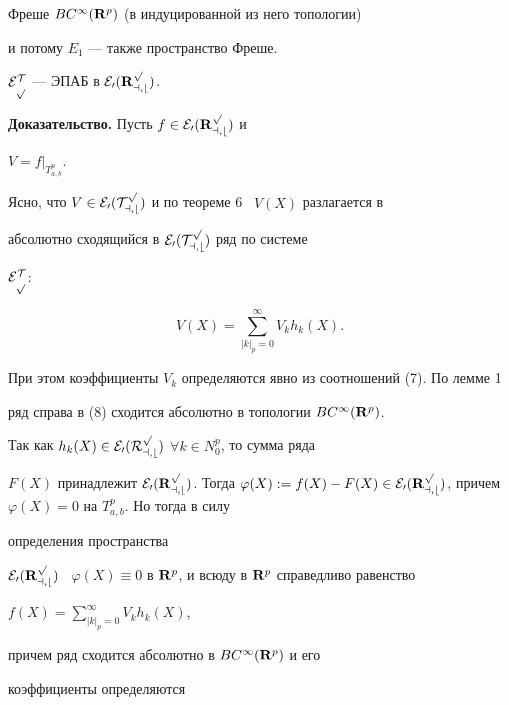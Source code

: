 Фреше $BC^{\infty}({\bold R}^p)$ (в индуцированной из него топологии) 


и потому $E_1$ --- также пространство Фреше.








\begin{thm}


$\cal{E} ^T_p$ --- ЭПАБ в $\cal{E} _0({\bold R}^p_{a,b})$.


\end{thm}








{\bf Доказательство.} Пусть $f\in \cal{E}_0({\bold R}^p_{a,b})$ и


$V=f|_{T^p_{a,b}}$.


Ясно, что $V\in\cal{E}_0(T^p_{a,b})$ и по теореме 6 \ $V(X)$ разлагается в


абсолютно сходящийся в $\cal{E}_0(T^p_{a,b})$ ряд по системе


$\cal{E}_p^T$:


\begin{equation}


V(X)=\sum^{\infty}_{|k|_p=0}V_kh_k(X).


\end{equation}


При этом коэффициенты $V_k$ определяются явно из соотношений (7). По лемме 1


ряд справа в (8) сходится абсолютно в топологии $BC^{\infty}({\bold R}^p)$.


Так как $h_k(X)\in\cal{E}_0(R_{a,b}^p)$ $\forall k\in N^p_0$, то сумма ряда


$F(X)$ принадлежит $\cal{E}_0({\bold R}^p_{a,b})$. Тогда $\varphi(X):=f(X)-


F(X)\in\cal{E}_0


({\bold R}^p_{a,b})$, причем $\varphi(X)=0$ на $T^p_{a,b}$. Но тогда в силу


определения пространства


$\cal{E}_0({\bold R}^p_{a,b})$ \ $\varphi(X)\equiv 0$ в ${\bold


R}^p$, и всюду в ${\bold R}^p$ справедливо равенство


$f(X)=\sum\limits_{|k|_p=0}^{\infty}V_kh_k(X)$,


причем ряд сходится абсолютно в $BC^{\infty}({\bold R}^p)$ и его


коэффициенты определяются


